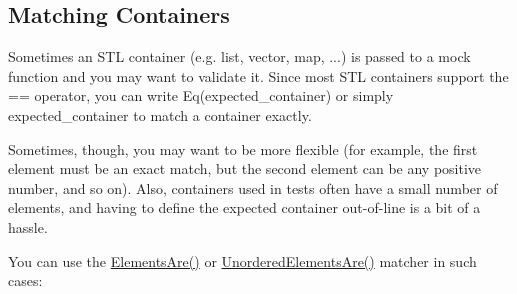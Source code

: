 \begin{DoxyCode}{0}
\DoxyCodeLine{}
\DoxyCodeLine{}
\DoxyCodeLine{  \}}
\DoxyCodeLine{}
\DoxyCodeLine{  \}}
\DoxyCodeLine{}
\DoxyCodeLine{  \}}
\DoxyCodeLine{\};}
\DoxyCodeLine{}
\DoxyCodeLine{\}}
\DoxyCodeLine{}
\DoxyCodeLine{}
\end{DoxyCode}


\subsection*{Matching Containers}

Sometimes an S\+TL container (e.\+g. list, vector, map, ...) is passed to a mock function and you may want to validate it. Since most S\+TL containers support the {\ttfamily ==} operator, you can write {\ttfamily Eq(expected\+\_\+container)} or simply {\ttfamily expected\+\_\+container} to match a container exactly.

Sometimes, though, you may want to be more flexible (for example, the first element must be an exact match, but the second element can be any positive number, and so on). Also, containers used in tests often have a small number of elements, and having to define the expected container out-\/of-\/line is a bit of a hassle.

You can use the {\ttfamily \mbox{\hyperlink{namespacetesting_a79cf4ae694bf8231dcf283b325405f27}{Elements\+Are()}}} or {\ttfamily \mbox{\hyperlink{namespacetesting_a8622c12aadfa0e60f7d68683eeb21115}{Unordered\+Elements\+Are()}}} matcher in such cases\+:


